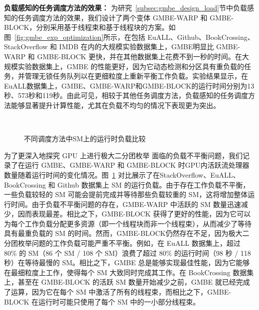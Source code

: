 \textbf{负载感知的任务调度方法的效果：} 为研究~\ref{subsec:gmbe_design_load}节中负载感知的任务调度方法的效果，我们设计了两个变体 GMBE-WARP 和 GMBE-BLOCK，分别采用基于线程束和基于线程块的方案。如图~\ref{fig:gmbe_exp_optimization}所示，在包括 EuALL、Github、BookCrossing、StackOverflow 和 IMDB 在内的大规模实验数据集上，GMBE明显比 GMBE-WARP 和 GMBE-BLOCK 更快，并在其他数据集上花费不到一秒的时间。在大规模实验数据集上，GMBE 的性能更好，因为它动态检测和分区具有重负载的任务，并管理无锁任务队列以在更细粒度上重新平衡工作负载。实验结果显示，在EuALL数据集上，GMBE、GMBE-WARP和GMBE-BLOCK的运行时间分别为13秒、573秒和119秒。由此可见，相较于其他任务调度方法，负载感知的任务调度方法能够显著提升计算性能，尤其在负载不均匀的情况下表现更为突出。

\begin{figure} [H]
	\centering
	 \\

	\caption{不同调度方法中SM上的运行时负载比较}

	\label{fig:gmbe_exp_balance}
\end{figure}



为了更深入地探究 GPU 上进行极大二分团枚举 面临的负载不平衡问题，我们记录了在运行 GMBE、GMBE-WARP 和 GMBE-BLOCK 时GPU内活跃流处理器数量随着运行时间的变化情况。图~\ref{fig:gmbe_exp_balance} 对比展示了在StackOverflow、EuALL、BookCrossing 和 Github 数据集上 SM 的运行负载。由于存在工作负载不平衡，一些负载较轻的 SM 可能会提前完成并等待那些负载较重的 SM，这将增加整体运行时间。由于负载不平衡问题的存在，GMBE-WARP 中活跃的 SM 数量迅速减少，因而表现最差。相比之下，GMBE-BLOCK 获得了更好的性能，因为它可以为每个工作负载分配更多资源（即一个线程块而非一个线程束），从而减少了等待具有最重负载的 SM 的时间。然而，GMBE-BLOCK仍然存在不足，因为极大二分团枚举问题的工作负载可能严重不平衡。例如，在 EuALL 数据集上，超过 80\% 的 SM（86 个 SM / 108 个 SM）浪费了超过 80\% 的运行时间（98 秒 / 118 秒）在等待最慢的 SM。相比之下，GMBE 总是能够实现最佳性能，因为它能够在最细粒度上工作，使得每个 SM 大致同时完成其工作。在 BookCrossing 数据集上，甚至在 GMBE-BLOCK 的活跃 SM 数量开始减少之前，GMBE 就已经完成了运算，因为它在每个 SM 中激活了所有的线程束，而相比之下，GMBE-BLOCK 在运行时可能只使用了每个 SM 中的一小部分线程束。



